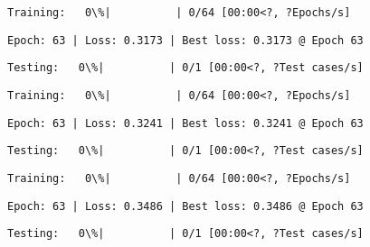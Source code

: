 \documentclass[11pt]{article}
\begin{document}
    
    
    \begin{Verbatim}[commandchars=\\\{\}]
Training:   0\%|          | 0/64 [00:00<?, ?Epochs/s]
    \end{Verbatim}

    
    \begin{Verbatim}[commandchars=\\\{\}]
Epoch: 63 | Loss: 0.3173 | Best loss: 0.3173 @ Epoch 63
    \end{Verbatim}

    
    \begin{Verbatim}[commandchars=\\\{\}]
Testing:   0\%|          | 0/1 [00:00<?, ?Test cases/s]
    \end{Verbatim}

    
    
    \begin{Verbatim}[commandchars=\\\{\}]
Training:   0\%|          | 0/64 [00:00<?, ?Epochs/s]
    \end{Verbatim}

    
    \begin{Verbatim}[commandchars=\\\{\}]
Epoch: 63 | Loss: 0.3241 | Best loss: 0.3241 @ Epoch 63
    \end{Verbatim}

    
    \begin{Verbatim}[commandchars=\\\{\}]
Testing:   0\%|          | 0/1 [00:00<?, ?Test cases/s]
    \end{Verbatim}

    
    
    \begin{Verbatim}[commandchars=\\\{\}]
Training:   0\%|          | 0/64 [00:00<?, ?Epochs/s]
    \end{Verbatim}

    
    \begin{Verbatim}[commandchars=\\\{\}]
Epoch: 63 | Loss: 0.3486 | Best loss: 0.3486 @ Epoch 63
    \end{Verbatim}

    
    \begin{Verbatim}[commandchars=\\\{\}]
Testing:   0\%|          | 0/1 [00:00<?, ?Test cases/s]
    \end{Verbatim}
\end{document}
